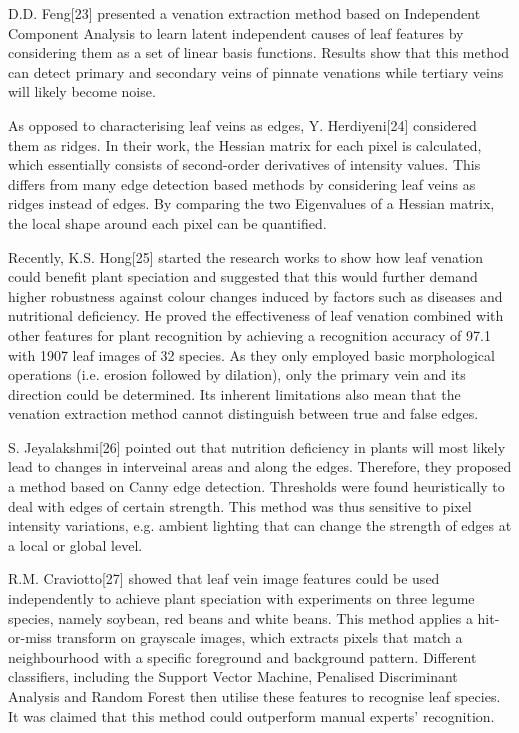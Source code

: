 \documentclass{report}
\begin{document}
{D.D. Feng[23] presented a venation extraction method based on
Independent Component Analysis to learn latent independent causes of
leaf features by considering them as a set of linear basis functions.
Results show that this method can detect primary and secondary veins
of pinnate venations while tertiary veins will likely become noise.

As opposed to characterising leaf veins as edges, Y. Herdiyeni[24]
considered them as ridges. In their work, the Hessian matrix for each
pixel is calculated, which essentially consists of second-order
derivatives of intensity values. This differs from many edge detection
based methods by considering leaf veins as ridges instead of edges. By
comparing the two Eigenvalues of a Hessian matrix, the local shape
around each pixel can be quantified.

Recently, K.S. Hong[25] started the research works to show how leaf
venation could benefit plant speciation and suggested that this would
further demand higher robustness against colour changes induced by
factors such as diseases and nutritional deficiency. He proved the effectiveness of leaf venation combined with other features for plant
recognition by achieving a recognition accuracy of 97.1%
with 1907 leaf images of 32 species. As they only employed basic
morphological operations (i.e. erosion followed by dilation), only the
primary vein and its direction could be determined. Its inherent
limitations also mean that the venation extraction method cannot
distinguish between true and false edges.

S. Jeyalakshmi[26] pointed out that nutrition deficiency in plants will
most likely lead to changes in interveinal areas and along the edges.
Therefore, they proposed a method based on Canny edge detection.
Thresholds were found heuristically to deal with edges of certain
strength. This method was thus sensitive to pixel intensity variations,
e.g. ambient lighting that can change the strength of edges at a local or
global level.

R.M. Craviotto[27] showed that leaf vein image features could be used
independently to achieve plant speciation with experiments on three
legume species, namely soybean, red beans and white beans. This
method applies a hit-or-miss transform on grayscale images, which
extracts pixels that match a neighbourhood with a specific foreground
and background pattern. Different classifiers, including the Support
Vector Machine, Penalised Discriminant Analysis and Random Forest
then utilise these features to recognise leaf species. It was claimed that
this method could outperform manual experts’ recognition.


}
\end{document}
